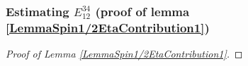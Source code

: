 \subsubsection{Estimating $ E_{12}^{34} $ (proof of lemma \ref{LemmaSpin1/2EtaContribution1})}
\begin{proof}[Proof of Lemma \ref{LemmaSpin1/2EtaContribution1}]

\end{proof}
